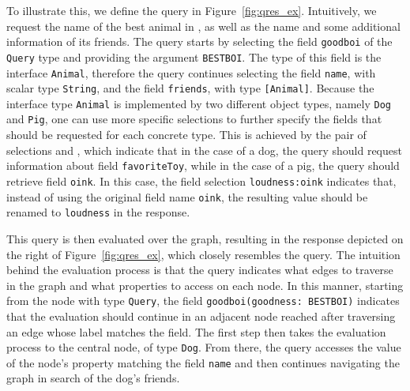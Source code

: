 To illustrate this, we define the query in
Figure~\ref{fig:qres_ex}. Intuitively, we request the name of the best
animal in \goodbois, as well as the name and some additional
information of its friends. The query starts by selecting the field
\texttt{goodboi} of the \texttt{Query} type and providing the argument
\texttt{BESTBOI}. The type of this field is the interface
\texttt{Animal}, therefore the query continues selecting the field
\texttt{name}, with scalar type \texttt{String}, and the field
\texttt{friends}, with type \texttt{[Animal]}.  Because the interface
type \texttt{Animal} is implemented by two different object types,
namely \texttt{Dog} and \texttt{Pig}, one can use more specific
selections to further specify the fields that should be requested for
each concrete type. This is achieved by the pair of selections
 and , which indicate that in the case of a 
dog, the query should request information about field
\texttt{favoriteToy}, while in the case of a pig, the query should
retrieve field \texttt{oink}. In this case, the field selection
\texttt{loudness:oink} indicates that, instead of using the original
field name \texttt{oink}, the resulting value should
be renamed to \texttt{loudness} in the response. %

This query is then evaluated over the graph, resulting in the response
depicted on the right of Figure~\ref{fig:qres_ex}, which closely
resembles the query.  The intuition behind the evaluation process is
that the query indicates what edges to traverse in the graph and what
properties to access on each node. In this manner, starting from the
node with type \texttt{Query}, the field \texttt{goodboi(goodness:
  BESTBOI)} indicates that the evaluation should continue in an
adjacent node reached after traversing an edge whose label matches the
field. The first step then takes the evaluation process to the central
node, of type \texttt{Dog}.  From there, the query accesses the value
of the node's property matching the field \texttt{name} and then
continues navigating the graph in search of the dog's friends.


